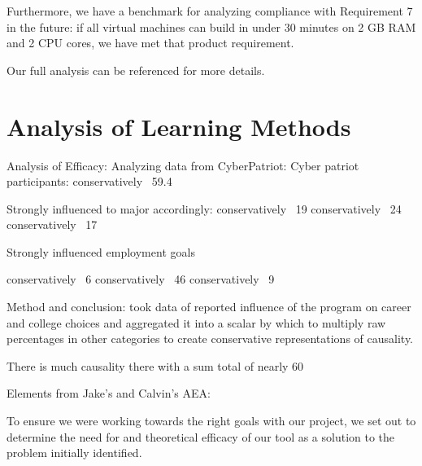 \documentclass[openright]{report}
\begin{document}
\par Furthermore, we have a benchmark for analyzing compliance with Requirement 7 in the future: if all virtual machines can build in under 30 minutes on 2 GB RAM and 2 CPU cores, we have met that product requirement. 

\par Our full analysis can be referenced for more details.

\section{Analysis of Learning Methods}
\ifx
    Analysis of Efficacy:
        Analyzing data from CyberPatriot: 
        Cyber patriot participants:
            conservatively ~59.4%
            
            Strongly influenced to major accordingly:
            conservatively ~19%
            conservatively ~24%
            conservatively ~17%
            
            Strongly influenced employment goals
            
            conservatively ~6%
            conservatively ~46%
            conservatively ~9%
            
        Method and conclusion:
            took data of reported influence of the program on career and college choices and aggregated it into a scalar by which to multiply raw percentages in other categories to create conservative representations of causality.
            
            There is much causality there with a sum total of nearly 60%
            
            
Elements from Jake's and Calvin's AEA:
    
\fi
\par To ensure we were working towards the right goals with our project, we set out to determine the need for and theoretical efficacy of our tool as a solution to the problem initially identified.
\end{document}
